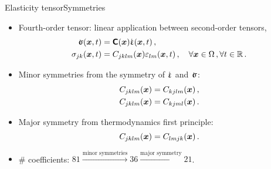\begin{frame}{Elasticity tensor}{Symmetries}

\begin{itemize}
\item Fourth-order tensor: linear application between second-order tensors,
\begin{displaymath}
\begin{split}
\stress(\xv,t) &=\tenselas(\xv)\strain(\xv,t)\,,\\
\stressj_{jk}(\xv,t) &=\tenselasj_{jklm}(\xv)\strainj_{lm}(\xv,t)\,,\quad\forall\xv\in\medium\,,\forall t\in\Rset\,.
\end{split}
\end{displaymath}
\item Minor symmetries from the symmetry of $\strain$ and $\stress$:
\begin{displaymath}
\begin{split}
{\Large C}_{jklm}({\boldsymbol{x}}) &= {\Large C}_{kjlm}({\boldsymbol{x}})\,, \\
{\Large C}_{jklm}({\boldsymbol{x}}) &= {\Large C}_{kjml}({\boldsymbol{x}})\,.
\end{split}
\end{displaymath}
\item Major symmetry from thermodynamics first principle:
\begin{displaymath}
{\Large C}_{jklm}({\boldsymbol{x}}) = {\Large C}_{lmjk}({\boldsymbol{x}})\,.
\end{displaymath}
\item \# coefficients: $81\xrightarrow[]{\text{minor symmetries}}36\xrightarrow[]{\text{major symmetry}}21$.
\end{itemize}

\end{frame}

